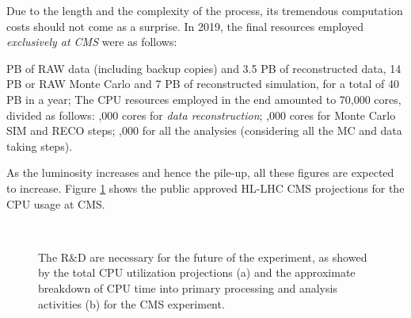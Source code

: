 Due to the length and the complexity of the process, its tremendous computation costs should not come as a surprise. In 2019, the final resources employed \emph{exclusively at CMS} were as follows:

\begin{outline}
     PB of RAW data (including backup copies) and 3.5 PB of reconstructed data, 14 PB or RAW Monte Carlo and 7 PB of reconstructed simulation, for a total of 40 PB in a year;
    \1 The CPU resources employed in the end amounted to 70,000 cores, divided as follows:
    ,000 cores for \emph{data reconstruction};
    ,000 cores for Monte Carlo SIM and RECO steps;
    ,000 for all the analysies (considering all the MC and data taking steps).
\end{outline}

As the luminosity increases and hence the pile-up, all these figures are expected to increase.
Figure \ref{fig:cpuusage} shows the public approved HL-LHC CMS projections for the CPU usage at CMS.

\begin{figure}
    \myfloatalign
     \\
    \caption[Computing estimates]{The R$\&$D are necessary for the future of the experiment, as showed by the total CPU utilization projections (a) and the approximate breakdown of CPU time into primary processing and analysis activities (b) for the CMS experiment.}\label{fig:cpuusage}
\end{figure}

